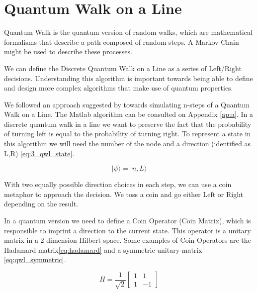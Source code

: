 
\section{Quantum Walk on a Line}
\label{sec:quantum_walk_line}

Quantum Walk is the quantum version of random walks, which are mathematical formalisms that describe a path composed of random steps. A Markov Chain might be used to describe these processes.

We can define the Discrete Quantum Walk on a Line as a series of Left/Right decisions. Understanding this algorithm is important towards being able to define and design more complex algorithms that make use of quantum properties.

 

We followed an approach suggested by \cite{Ambainis} towards simulating n-steps of a Quantum Walk on a Line. The Matlab algorithm can be consulted on Appendix \ref{ap:a}.
In a discrete quantum walk in a line we want to preserve the fact that the probability of turning left is equal to the probability of turning right.  To represent a state in this algorithm we will need the number of the node and a direction (identified as L,R) \eqref{eq:3_qwl_state}.


\begin{equation}
\label{eq:3_qwl_state}
\vert \psi\rangle = \vert n, L\rangle
\end{equation}

With two equally possible direction choices in each step, we can use a coin metaphor\cite{Ambainis}\cite{Ambainis2008} to approach the decision. We toss a coin and go either Left or Right depending on the result. 

In a quantum version we need to define a Coin Operator (Coin Matrix), which is responsible to imprint a direction to the current state. This operator is a unitary matrix in a 2-dimension Hilbert space. Some examples of Coin Operators are the Hadamard matrix\eqref{eq:hadamard} and a symmetric unitary matrix \eqref{eq:qwl_symmetric}.

\begin{equation}
\label{eq:hadamard}
H=\frac{1}{\sqrt{2}}\left[\begin{array}{cc}
1 & 1\\
1 & -1
\end{array}\right]
\end{equation}

